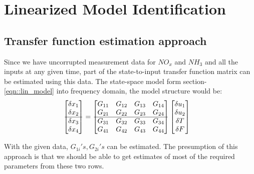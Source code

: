 \section{Linearized Model Identification}

\subsection{Transfer function estimation approach}
Since we have uncorrupted measurement data for $NO_x$ and $NH_3$ and all the
inputs at any given time, part of the state-to-input transfer function matrix
can be estimated using this data. The state-space model form
section-\ref{eqn::lin_model} into frequency domain, the model structure would
be:
\begin{align*}
    \begin{bmatrix} \delta x_1 \\ \delta x_2 \\ \hline \delta  x_3 \\ \delta x_4 \end{bmatrix} &= \begin{bmatrix} G_{11} & G_{12} & G_{13} & G_{14}\\
                G_{21} & G_{22} & G_{23} & G_{24}\\
                \hline
                G_{31} & G_{32} & G_{33} & G_{34}\\
                G_{41} & G_{42} & G_{43} & G_{44}\\
     \end{bmatrix}
    \begin{bmatrix} \delta u_1 \\ \delta u_2 \\ \delta T \\ \delta F \end{bmatrix}
\end{align*}

With the given data, $G_{1i}'s, G_{2i}'s$ can be estimated. The presumption of
this approach is that we should be able to get estimates of most of the required
parameters from these two rows.
